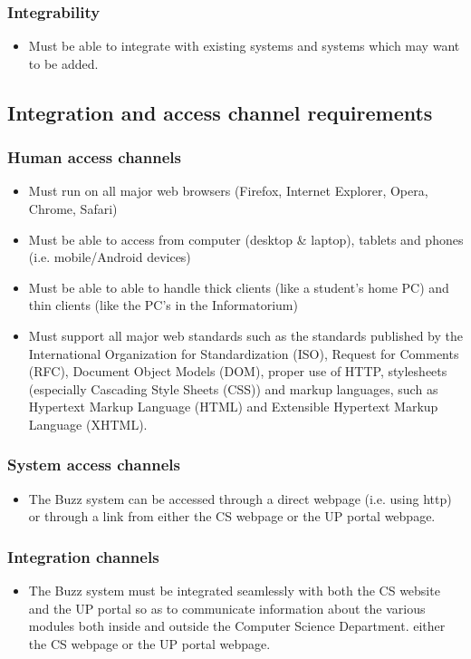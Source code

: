 \documentclass[12pt, oneside]{article}
\begin{document}
		\subsubsection{Integrability}
				\begin{itemize}
					\item Must be able to integrate with existing systems and systems which may want to be added.
				\end{itemize}
				
	\subsection{Integration and access channel requirements}
				\subsubsection{Human access channels}
				\begin{itemize}
					\item Must run on all major web browsers (Firefox, Internet Explorer, Opera, Chrome, Safari)
					\item Must be able to access from computer (desktop & laptop), tablets and phones (i.e. mobile/Android devices)
					\item Must be able to able to handle thick clients (like a student’s home PC) and thin clients (like the PC’s in the Informatorium)
					\item Must support all major web standards such as the standards published by the International Organization for Standardization (ISO), Request for Comments (RFC), Document Object Models (DOM), proper use of HTTP, stylesheets (especially Cascading Style Sheets (CSS)) and markup languages, such as Hypertext Markup Language (HTML) and Extensible Hypertext Markup Language (XHTML).
				\end{itemize}
				\subsubsection{System access channels}
				\begin{itemize}
					\item The Buzz system can be accessed through a direct webpage (i.e. using http) or through a link from either the CS webpage or the UP portal webpage.
				\end{itemize}
				\subsubsection{Integration channels}
				\begin{itemize}
					\item The Buzz system must be integrated seamlessly with both the CS website and the UP portal so as to communicate information about the various modules both inside and outside the Computer Science Department. either the CS webpage or the UP portal webpage.
				\end{itemize}
\end{document}
